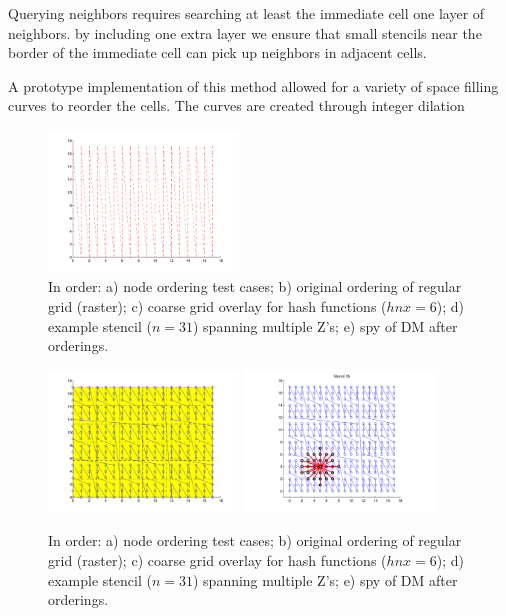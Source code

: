 \documentclass{report}
\begin{document}
Querying neighbors requires searching at least the immediate cell one layer of neighbors. by including one extra layer we ensure that small stencils near the border of the immediate cell can pick up neighbors in adjacent cells.



A prototype implementation of this method allowed for a variety of space filling curves to reorder the cells. The curves are created through integer dilation \cite{IntegerD} 


\begin{figure}
\centering
\includegraphics[width=0.45\textwidth]{rbffd_methods_content/hashing/originalorder_regulargrid-eps-converted-to.pdf}
\caption{In order: a) node ordering test cases; b) original ordering of regular grid (raster); c) coarse grid overlay for hash functions ($hnx = 6$); d) example stencil ($n=31$) spanning multiple Z's; e) spy of DM after orderings. }
\label{fig:orderings}
\end{figure}

\begin{figure}
\centering
\includegraphics[width=0.45\textwidth]{rbffd_methods_content/hashing/overlay_regulargrid-eps-converted-to.pdf} \includegraphics[width=0.45\textwidth]{rbffd_methods_content/hashing/stencil_regulargrid-eps-converted-to.pdf}
\caption{In order: a) node ordering test cases; b) original ordering of regular grid (raster); c) coarse grid overlay for hash functions ($hnx = 6$); d) example stencil ($n=31$) spanning multiple Z's; e) spy of DM after orderings. }
\label{fig:orderings}
\end{figure}
\end{document}
